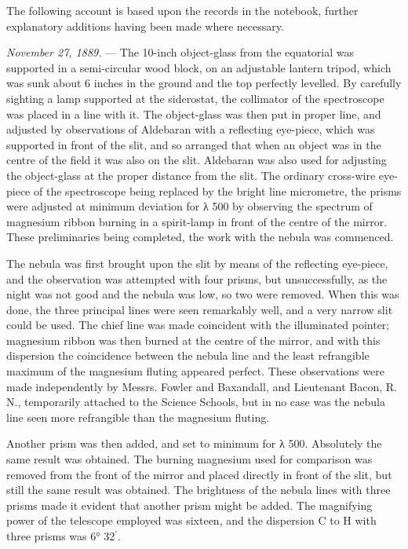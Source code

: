 \documentclass[a4paper, 12pt, oneside, polutonikogreek, english]{article}
\begin{document}
The following account is based upon the records in the notebook, further explanatory additions having been made where necessary.

\emph{November 27, 1889.} --- The 10-inch object-glass from the equatorial was supported in a semi-circular wood block, on an adjustable lantern tripod, which was sunk about 6 inches in the ground and the top perfectly levelled. By carefully sighting a lamp supported at the siderostat, the collimator of the spectroscope was placed in a line with it. The object-glass was then put in proper line, and adjusted by observations of Aldebaran with a reflecting eye-piece, which was supported in front of the slit, and so arranged that when an object was in the centre of the field it was also on the slit. Aldebaran was also used for adjusting the object-glass at the proper distance from the slit. The ordinary cross-wire eye-piece of the spectroscope being replaced by the bright line micrometre, the prisms were adjusted at minimum deviation for λ 500 by observing the spectrum of magnesium ribbon burning in a spirit-lamp in front of the centre of the mirror. These preliminaries being completed, the work with the nebula was commenced.

The nebula was first brought upon the slit by means of the reflecting eye-piece, and the observation was attempted with four prisms, but unsuccessfully, as the night was not good and the nebula was low, so two were removed. When this was done, the three principal lines were seen remarkably well, and a very narrow slit could be used. The chief line was made coincident with the illuminated pointer; magnesium ribbon was then burned at the centre of the mirror, and with this dispersion the coincidence between the nebula line and the least refrangible maximum of the magnesium fluting appeared perfect. These observations were made independently by Messrs. Fowler and Baxandall, and Lieutenant Bacon, R. N., temporarily attached to the Science Schools, but in no case was the nebula line seen more refrangible than the magnesium fluting.

Another prism was then added, and set to minimum for λ 500. Absolutely the same result was obtained. The burning magnesium used for comparison was removed from the front of the mirror and placed directly in front of the slit, but still the same result was obtained. The brightness of the nebula lines with three prisms made it evident that another prism might be added. The magnifying power of the telescope employed was sixteen, and the dispersion C to H with three prisms was 6° 32$^{\prime}$.
\end{document}
